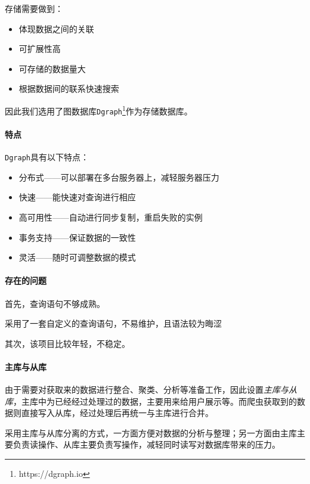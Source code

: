 \documentclass[UTF8]{ctexrep}
\begin{document}
存储需要做到：
\begin{itemize}
    \item 体现数据之间的关联
    \item 可扩展性高
    \item 可存储的数据量大
    \item 根据数据间的联系快速搜索
\end{itemize}

因此我们选用了图数据库\texttt{Dgraph}\footnote{https://dgraph.io}作为存储数据库。

\paragraph{特点}

\texttt{Dgraph}具有以下特点：

\begin{itemize}
    \item 分布式——可以部署在多台服务器上，减轻服务器压力
    \item 快速——能快速对查询进行相应
    \item 高可用性——自动进行同步复制，重启失败的实例
    \item 事务支持——保证数据的一致性
    \item 灵活——随时可调整数据的模式
\end{itemize}

\paragraph{存在的问题}

首先，查询语句不够成熟。
\par
采用了一套自定义的查询语句，不易维护，且语法较为晦涩
\par
其次，该项目比较年轻，不稳定。

\paragraph{主库与从库}

由于需要对获取来的数据进行整合、聚类、分析等准备工作，因此设置\emph{主库与从库}，主库中为已经经过处理过的数据，主要用来给用户展示等。而爬虫获取到的数据则直接写入从库，经过处理后再统一与主库进行合并。

\par

采用主库与从库分离的方式，一方面方便对数据的分析与整理；另一方面由主库主要负责读操作、从库主要负责写操作，减轻同时读写对数据库带来的压力。
\end{document}
